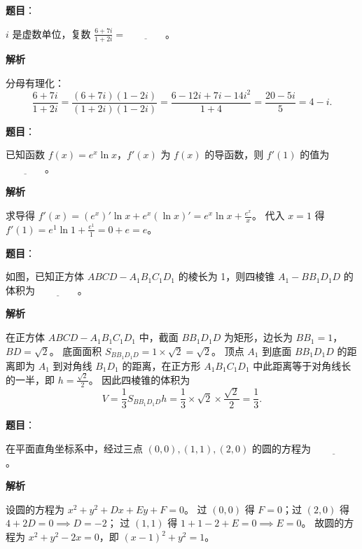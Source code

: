 \begin{answer}

\textbf{题目}：

$i$ 是虚数单位，复数 $\frac{6+7i}{1+2i}=\underline{\qquad\qquad}$。

\textbf{解析}

分母有理化：
\nopagebreak[4]
\[\frac{6+7i}{1+2i}=\frac{(6+7i)(1-2i)}{(1+2i)(1-2i)}=\frac{6-12i+7i-14i^2}{1+4}=\frac{20-5i}{5}=4-i.\]


\end{answer}
\begin{answer}

\textbf{题目}：

已知函数 $f(x)=e^x\ln x$，$f'(x)$ 为 $f(x)$ 的导函数，则 $f'(1)$ 的值为 $\underline{\qquad\qquad}$。

\textbf{解析}

求导得 $f'(x)=(e^x)'\ln x+e^x(\ln x)'=e^x\ln x+\frac{e^x}{x}$。
代入 $x=1$ 得 $f'(1)=e^1\ln 1+\frac{e^1}{1}=0+e=e$。


\end{answer}
\begin{answer}

\textbf{题目}：

如图，已知正方体 $ABCD-A_1B_1C_1D_1$ 的棱长为 1，则四棱锥 $A_1-BB_1D_1D$ 的体积为 $\underline{\qquad\qquad}$。
\nopagebreak[4]
\begin{center}\end{center}
\nopagebreak[4]
\textbf{解析}

在正方体 $ABCD-A_1B_1C_1D_1$ 中，截面 $BB_1D_1D$ 为矩形，边长为 $BB_1=1$，$BD=\sqrt2$。
底面面积 $S_{BB_1D_1D}=1\times\sqrt2=\sqrt2$。
顶点 $A_1$ 到底面 $BB_1D_1D$ 的距离即为 $A_1$ 到对角线 $B_1D_1$ 的距离，在正方形 $A_1B_1C_1D_1$ 中此距离等于对角线长的一半，即 $h=\frac{\sqrt2}{2}$。
因此四棱锥的体积为
\nopagebreak[4]
\[V=\frac13 S_{BB_1D_1D} h=\frac13\times\sqrt2\times\frac{\sqrt2}{2}=\frac13.\]


\end{answer}
\begin{answer}

\textbf{题目}：

在平面直角坐标系中，经过三点 $(0,0),(1,1),(2,0)$ 的圆的方程为 $\underline{\qquad\qquad}$。

\textbf{解析}

设圆的方程为 $x^2+y^2+Dx+Ey+F=0$。
过 $(0,0)$ 得 $F=0$；过 $(2,0)$ 得 $4+2D=0\implies D=-2$；
过 $(1,1)$ 得 $1+1-2+E=0\implies E=0$。
故圆的方程为 $x^2+y^2-2x=0$，即 $(x-1)^2+y^2=1$。


\end{answer}
